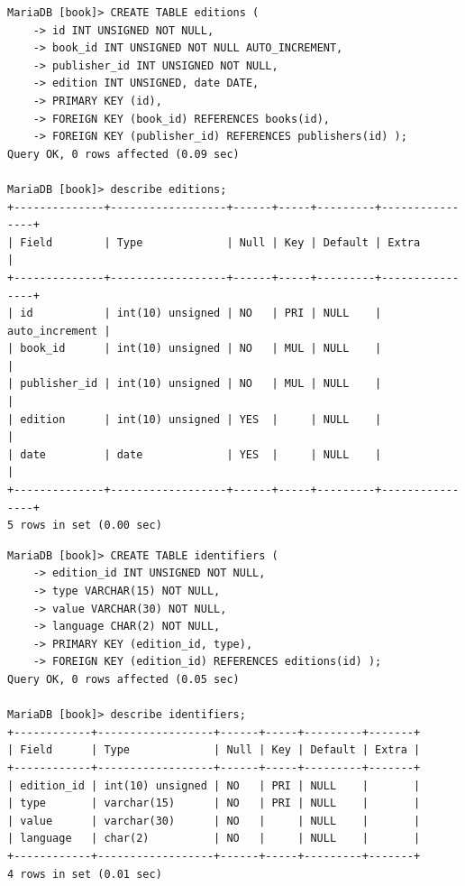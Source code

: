 \documentclass{assignment}
\begin{document}
\begin{verbatim}
MariaDB [book]> CREATE TABLE editions ( 
    -> id INT UNSIGNED NOT NULL,
    -> book_id INT UNSIGNED NOT NULL AUTO_INCREMENT, 
    -> publisher_id INT UNSIGNED NOT NULL, 
    -> edition INT UNSIGNED, date DATE, 
    -> PRIMARY KEY (id), 
    -> FOREIGN KEY (book_id) REFERENCES books(id), 
    -> FOREIGN KEY (publisher_id) REFERENCES publishers(id) );
Query OK, 0 rows affected (0.09 sec)

MariaDB [book]> describe editions;
+--------------+------------------+------+-----+---------+----------------+
| Field        | Type             | Null | Key | Default | Extra          |
+--------------+------------------+------+-----+---------+----------------+
| id           | int(10) unsigned | NO   | PRI | NULL    | auto_increment |
| book_id      | int(10) unsigned | NO   | MUL | NULL    |                |
| publisher_id | int(10) unsigned | NO   | MUL | NULL    |                |
| edition      | int(10) unsigned | YES  |     | NULL    |                |
| date         | date             | YES  |     | NULL    |                |
+--------------+------------------+------+-----+---------+----------------+
5 rows in set (0.00 sec)

\end{verbatim}

\begin{verbatim}
MariaDB [book]> CREATE TABLE identifiers ( 
    -> edition_id INT UNSIGNED NOT NULL, 
    -> type VARCHAR(15) NOT NULL, 
    -> value VARCHAR(30) NOT NULL, 
    -> language CHAR(2) NOT NULL, 
    -> PRIMARY KEY (edition_id, type), 
    -> FOREIGN KEY (edition_id) REFERENCES editions(id) );
Query OK, 0 rows affected (0.05 sec)

MariaDB [book]> describe identifiers;
+------------+------------------+------+-----+---------+-------+
| Field      | Type             | Null | Key | Default | Extra |
+------------+------------------+------+-----+---------+-------+
| edition_id | int(10) unsigned | NO   | PRI | NULL    |       |
| type       | varchar(15)      | NO   | PRI | NULL    |       |
| value      | varchar(30)      | NO   |     | NULL    |       |
| language   | char(2)          | NO   |     | NULL    |       |
+------------+------------------+------+-----+---------+-------+
4 rows in set (0.01 sec)
\end{verbatim}
\end{document}
